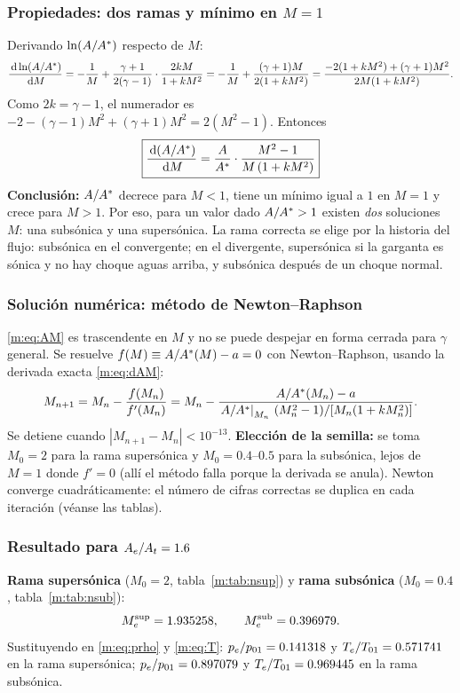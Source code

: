 \subsubsection{Propiedades: dos ramas y mínimo en $M=1$}
Derivando $\ln(A/A^{*})$ respecto de $M$:
\[
\frac{\,\mathrm{d}\ln(A/A^{*})}{\,\mathrm{d} M}=-\frac{1}{M}+\frac{\gamma+1}{2(\gamma-1)}\cdot\frac{2kM}{1+kM^2}
=-\frac1M+\frac{(\gamma+1)M}{2(1+kM^2)}
=\frac{-2(1+kM^2)+(\gamma+1)M^2}{2M(1+kM^2)}.
\]
Como $2k=\gamma-1$, el numerador es $-2-(\gamma-1)M^2+(\gamma+1)M^2=2(M^2-1)$. Entonces
\begin{equation}
\boxed{\frac{\,\mathrm{d}(A/A^{*})}{\,\mathrm{d} M}=\frac{A}{A^{*}}\cdot\frac{M^2-1}{M\left(1+kM^2\right)}}\label{m:eq:dAM}
\end{equation}
\textbf{Conclusión:} $A/A^{*}$ decrece para $M<1$, tiene un mínimo igual a $1$ en $M=1$ y crece para $M>1$. Por eso, para un valor dado
$A/A^{*}>1$ existen \emph{dos} soluciones $M$: una subsónica y una supersónica. La rama correcta se elige por la historia del flujo:
subsónica en el convergente; en el divergente, supersónica si la garganta es sónica y no hay choque aguas arriba,
y subsónica después de un choque normal.

\subsubsection{Solución numérica: método de Newton--Raphson}
\eqref{m:eq:AM} es trascendente en $M$ y no se puede despejar en forma cerrada para $\gamma$ general. Se resuelve
$f(M)\equiv A/A^{*}(M)-a=0$ con Newton--Raphson, usando la derivada exacta \eqref{m:eq:dAM}:
\[
M_{n+1}=M_n-\frac{f(M_n)}{f'(M_n)}=M_n-\frac{A/A^{*}(M_n)-a}{\left.A/A^{*}\right|_{M_n}\,(M_n^2-1)/[M_n(1+kM_n^2)]}.
\]
Se detiene cuando $|M_{n+1}-M_n|<10^{-13}$. \textbf{Elección de la semilla:} se toma $M_0=2$ para la rama supersónica y $M_0=0.4$--$0.5$ para la
subsónica, lejos de $M=1$ donde $f'=0$ (allí el método falla porque la derivada se anula).
Newton converge cuadráticamente: el número de cifras correctas se duplica en cada iteración (véanse las tablas).

\subsubsection{Resultado para $A_e/A_t=1.6$}
\textbf{Rama supersónica} ($M_0=2$, tabla~\ref{m:tab:nsup}) y \textbf{rama subsónica} ($M_0=0.4$, tabla~\ref{m:tab:nsub}):
\[
M_e^{\rm sup}=1.935258,\qquad M_e^{\rm sub}=0.396979 .
\]
Sustituyendo en \eqref{m:eq:prho} y \eqref{m:eq:T}: $p_e/p_{01}=0.141318$ y $T_e/T_{01}=0.571741$ en la rama supersónica;
$p_e/p_{01}=0.897079$ y $T_e/T_{01}=0.969445$ en la rama subsónica.

